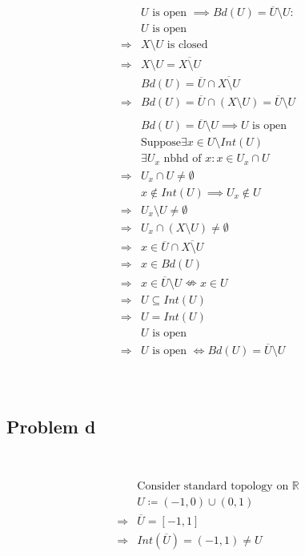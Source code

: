 \documentclass{article}
\begin{document}
\begin{equation*}
    \begin{split}
        &U\text{ is open }\implies Bd(U)=\overline{U}\setminus U:\\
        &U\text{ is open}\\
        \Rightarrow&X\setminus U\text{ is closed}\\
        \Rightarrow&X\setminus U=\overline{X\setminus U}\\
        &Bd(U)=\overline{U}\cap\overline{X\setminus U}\\
        \Rightarrow&Bd(U)=\overline{U}\cap(X\setminus U)=\overline{U}\setminus U\\
        &\\
        &Bd(U)=\overline{U}\setminus U\implies U\text{ is open}\\
        &\text{Suppose} \exists x\in U\setminus Int(U)\\
        &\exists U_x\text{ nbhd of }x: x\in U_x\cap U\\
        \Rightarrow&U_x\cap U\ne \emptyset\\
        &x\notin Int(U)\implies U_x\notin U\\
        \Rightarrow&U_x\setminus U\ne \emptyset\\
        \Rightarrow&U_x\cap(X\setminus U)\ne\emptyset\\
        \Rightarrow&x\in\overline{U}\cap\overline{X\setminus U}\\
        \Rightarrow&x\in Bd(U)\\
        \Rightarrow&x\in \overline{U}\setminus U\nLeftrightarrow x\in U\\
        \Rightarrow&U\subseteq Int(U)\\
        \Rightarrow&U=Int(U)\\
        &U\text{ is open}\\
        \Rightarrow&U\text{ is open }\Leftrightarrow Bd(U)=\overline{U}\setminus U\\
    \end{split}
\end{equation*}

~

\subsection*{Problem d}

~

\begin{equation*}
    \begin{split}
        &\text{Consider standard topology on }\mathbb{R} \\
        &U\coloneqq (-1,0)\cup(0,1)\\
        \Rightarrow&\overline{U}=[-1,1]\\
        \Rightarrow&Int(\overline{U})=(-1,1)\ne U\\
    \end{split}
\end{equation*}
\end{document}
